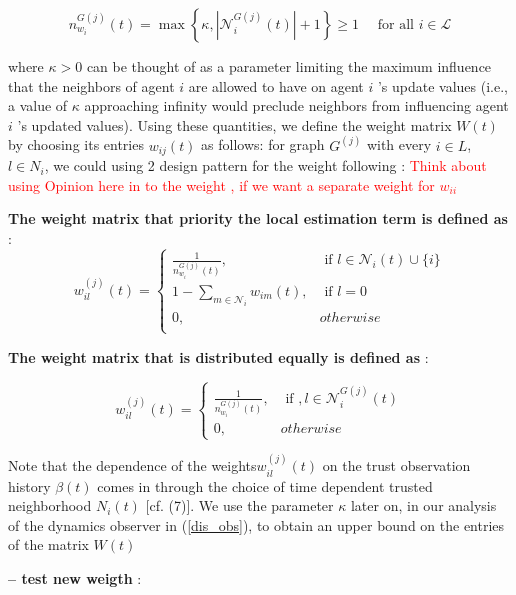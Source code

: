 \documentclass[letterpaper, 10pt, conference]{ieeeconf}  %
\def\eqref#1{(\ref{#1})}
\begin{document}
\begin{equation}\label{kappa}
n_{w_i}^{G(j)}(t)=\max \left\{\kappa,\left|\mathcal{N}_i^{G(j)}(t)\right|+1\right\} \geq 1 \quad \text { for all } i \in \mathcal{L}
\end{equation}


where $\kappa>0$ can be thought of as a parameter limiting the maximum influence that the neighbors of agent $i$ are allowed to have on agent $i$ 's update values (i.e., a value of $\kappa$ approaching infinity would preclude neighbors from influencing agent $i$ 's updated values). Using these quantities, we define the weight matrix $W(t)$ by choosing its entries $w_{i j}(t)$ as follows: for graph $G^{(j)}$ with every $i\in L$, $l \in N_i$, we could using 2 design pattern for the weight following :
\textcolor{red}{Think about using Opinion here in to the weight , if we want a separate weight for $w_{ii}$}

\textbf{ The  weight matrix that priority the local estimation term is defined as }:
\begin{equation}\label{weight_0}
w_{i l}^{(j)}(t)= \begin{cases}
\frac{1}{n_{w_i}^{G(j)}(t)}, & \text { if } l \in \mathcal{N}_i(t) \cup\{i\} \\ 
1-\sum_{m \in \mathcal{N}_i} w_{i m}(t), & \text { if } l=0 \\
0, & otherwise \\ 
\end{cases}
\end{equation}


\textbf{The  weight matrix that is distributed equally is defined as }:

\begin{equation}\label{weight_equal}
w_{i l}^{(j)}(t)= \begin{cases}
\frac{1}{n_{w_i}^{G(j)}(t)}, & \text { if }, l \in \mathcal{N}_i^{G(j)}(t) \\ 
0, & otherwise
\end{cases}
\end{equation}

Note that the dependence of the weights$ w_{i l}^{(j)}(t)$ on the trust observation history $\beta (t)$ comes in through the choice of time dependent trusted neighborhood $N_i(t)$ [cf. (7)]. We use the parameter $\kappa$ later on, in our analysis of the dynamics observer in \eqref{dis_obs}, to obtain an upper bound on the entries of the matrix $W(t)$

\textbf{-- test new weigth }:
\end{document}
